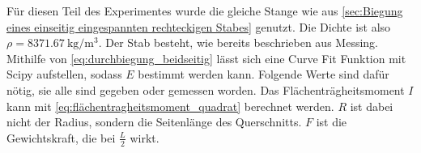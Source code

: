 \begin{table}
    \centering
    \caption{Messergebnisse zu dem zweiseitig eingespannten rechteckigen Stab}
    \label{tab:zweiseitig_eckig}
\end{table}

Für diesen Teil des Experimentes wurde die gleiche Stange wie aus \autoref{sec:Biegung eines einseitig eingespannten rechteckigen Stabes} genutzt. Die Dichte ist also $\rho = \SI{8371.67}{\kilogram \per \cubic\meter}$. Der Stab besteht, wie bereits beschrieben aus Messing. Mithilfe von \autoref{eq:durchbiegung_beidseitig} lässt sich eine Curve Fit Funktion mit Scipy aufstellen, sodass $E$ bestimmt werden kann. Folgende Werte sind dafür nötig, sie alle sind gegeben oder gemessen worden. Das Flächenträgheitsmoment $I$ kann mit \autoref{eq:flächentragheitsmoment_quadrat} berechnet werden. $R$ ist dabei nicht der Radius, sondern die Seitenlänge des Querschnitts. $F$ ist die Gewichtskraft, die bei $\frac{L}{2}$ wirkt.  

